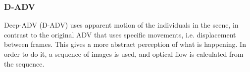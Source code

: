 

\subsubsection{D-ADV}\label{sec:architecture:DADV}

Deep-ADV (D-ADV) uses apparent motion of the individuals in the scene, in contrast to the original ADV that uses specific movements, i.e. displacement between frames. This gives a more abstract perception of what is happening. In order to do it, a sequence of images is used, and optical flow is calculated from the sequence.  








